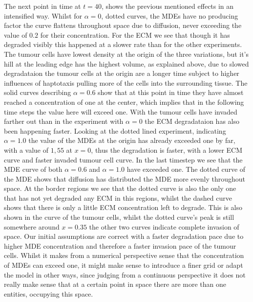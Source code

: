 The next point in time at $t=40$, shows the previous mentioned effects in an intensified way. Whilst for $\alpha=0$, dotted curves, the MDEs have no producing factor the curve flattens throughout space due to diffusion, never exceeding the value of $0.2$ for their concentration. For the ECM we see that though it has degraded visibly this happened at a slower rate than for the other experiments. The tumour cells have lowest density at the origin of the three variations, but it's hill at the leading edge has the highest volume, as explained above, due to slowed degradataion the tumour cells at the origin are a longer time subject to higher influences of haptotaxis pulling more of the cells into the surrounding tissue. The solid curves describing $\alpha = 0.6$ show that at this point in time they have almost reached a concentration of one at the center, which implies that in the following time steps the value here will exceed one. With the tumour cells have invaded farther out than in the experiment with $\alpha=0$ the ECM degradataion has also been happening faster.
Looking at the dotted lined experiment, indicating $\alpha=1.0$ the value of the MDEs at the origin has already exceeded one by far, with a value of $1,55$ at $x=0$, thus the degradation is faster, with a lower ECM curve and faster invaded tumour cell curve. 
In the last timestep we see that the MDE curve of both $\alpha=0.6$ and $\alpha=1.0$ have exceeded one. The dotted curve of the MDE shows that diffusion has distributed the MDE more evenly throughout space. At the border regions we see that the dotted curve is also the only one that has not yet degraded any ECM in this regions, whilst the dashed curve shows that there is only a little ECM concentration left to degrade. This is also shown in the curve of the tumour cells, whilst the dotted curve's peak is still somewhere around $x=0.35$ the other two curves indicate complete invasion of space. 
Our initial assumptions are correct with a faster degradation pace due to higher MDE concentration and therefore a faster invasion pace of the tumour cells. Whilst it makes from a numerical perspective sense that the concentration of MDEs can exceed one, it might make sense to introduce a finer grid or adapt the model in other ways, since judging from a continuous perspective it does not really make sense that at a certain point in space there are more than one entities, occupying this space. 

